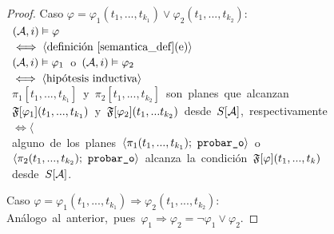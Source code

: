 \begin{proof}
\noindent Caso $\varphi = \varphi_1(t_1,...,t_{k_1}) \lor \varphi_2(t_1,...,t_{k_2}) $:\\
\mbox{\hspace{10mm} $(\mathcal{A}, i) \vDash \varphi$}\\
\mbox{\hspace{5mm} $\iff \langle \text{definición \ref{semantica_def}(e)} \rangle$}\\
\mbox{\hspace{10mm} $(\mathcal{A}, i) \vDash \varphi_1$ o $(\mathcal{A}, i) \vDash \varphi_2$}\\
\mbox{\hspace{5mm} $\iff \langle \text{hipótesis inductiva} \rangle$}\\
\mbox{\hspace{10mm} $\pi_1[t_1,...,t_{k_1}]$ y $\pi_2[t_1,...,t_{k_2}]$ son planes que
alcanzan}\\
\mbox{\hspace{10mm} $\mathfrak{F}[\varphi_1](t_1,...,t_{k_1})$ y $\mathfrak{F}[\varphi_2](t_1,...t_{k_2})$
desde $S[\mathcal{A}]$, respectivamente}\\
\mbox{\hspace{5mm} $\iff \langle$ }\\
\mbox{\hspace{5mm} alguno de los planes
$\tup{\pi_1(t_1,...,t_{k_1});\ \texttt{probar\_o}}$ o}\\
\mbox{\hspace{5mm}
$\tup{\pi_2(t_1,...,t_{k_2});\ \texttt{probar\_o}}$ alcanza la condición
$\mathfrak{F}[\varphi](t_1,...,t_k)$}\\
\mbox{\hspace{5mm} desde $S[\mathcal{A}]$.}

\noindent Caso $\varphi = \varphi_1(t_1,...,t_{k_1}) \Rightarrow \varphi_2(t_1,...,t_{k_2}) $:\\
\mbox{\hspace{10mm}Análogo al anterior, pues $\varphi_1 \Rightarrow \varphi_2 =
\neg \varphi_1 \lor \varphi_2$.}


\end{proof}
